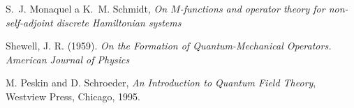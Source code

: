 \begin{thebibliography}{10}

    S.~J. Monaquel a K.~M. Schmidt, \textit{On $M$-functions and operator
      theory for non-self-adjoint discrete Hamiltonian systems}

        Shewell, J. R. (1959). \textit{On the Formation of Quantum-Mechanical 
        Operators. American Journal of Physics}

        M. Peskin and D. Schroeder, \textit{An Introduction to Quantum Field Theory},
        Westview Press, Chicago, 1995.

\end{thebibliography}

\cleardoublepage

